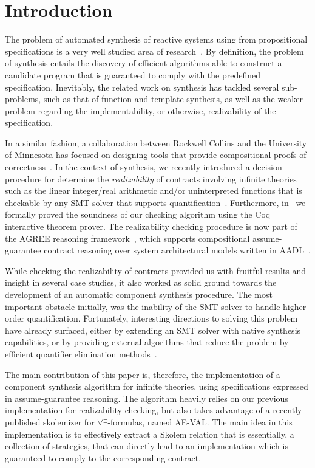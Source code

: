 \section{Introduction}
The problem of automated synthesis of reactive systems using from propositional specifications is a very well studied area of research~\cite{gulwani2010dimensions}. By definition, the problem of synthesis entails the discovery of efficient algorithms able to construct a candidate program that is guaranteed to comply with the predefined specification. Inevitably, the related work on synthesis has tackled several sub-problems, such as that of function and template synthesis, as well as the weaker problem regarding the implementability, or otherwise, realizability of the specification.

In a similar fashion, a collaboration between Rockwell Collins and
the University of Minnesota has focused on designing tools that provide
compositional proofs of correctness~\cite{NFM2012:CoGaMiWhLaLu,Whalen13:WhatHow:TwinPeaksIEEESoftware,hilt2013,QFCS15:backes}.
In the context of synthesis, we recently introduced a decision procedure for determine the {\em realizability} of contracts involving infinite theories such as the linear integer/real arithmetic and/or uninterpreted functions that is checkable by any SMT solver that supports quantification~\cite{Katis15:Realizability}. Furthermore, in~\cite{Katis:machine} we formally proved the soundness of our checking algorithm using the Coq interactive theorem prover. The realizability checking procedure is now part of the AGREE reasoning framework~\cite{NFM2012:CoGaMiWhLaLu}, which supports compositional
assume-guarantee contract reasoning over system architectural models written in
AADL~\cite{SAE:AADL}.

While checking the realizability of contracts provided us with fruitful results
and insight in several case studies, it also worked as solid ground towards the
development of an automatic component synthesis procedure. The
most important obstacle initially, was the inability of the SMT solver to
handle higher-order quantification. Fortunately, interesting directions to
solving this problem have already surfaced, either by extending an SMT solver
with native synthesis capabilities\cite{reynoldscounterexample}, or by providing
external algorithms that reduce the problem by efficient quantifier elimination methods~\cite{fedyukovichae}.

The main contribution of this paper is, therefore, the implementation of a
component synthesis algorithm for infinite theories, using specifications
expressed in assume-guarantee reasoning.  The algorithm heavily relies on our previous implementation for realizability checking, but also takes advantage of a recently published skolemizer for $\forall\exists$-formulas, named
AE-VAL. The main idea in this implementation is to effectively extract a Skolem
relation that is essentially, a collection of strategies, that can directly lead to an implementation which is guaranteed to comply to the corresponding contract.

